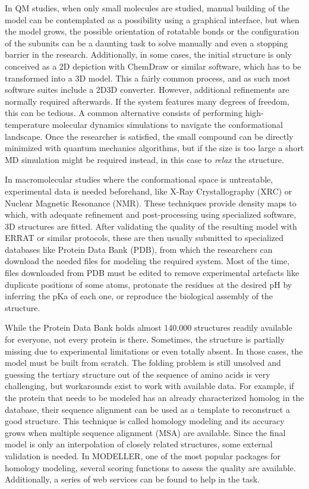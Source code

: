 In QM studies, when only small molecules are studied, manual building of the model can be contemplated as a possibility using a graphical interface,\cite{gaussview,avogadro} but when the model grows, the possible orientation of rotatable bonds or the configuration of the subunits can be a daunting task to solve manually and even a stopping barrier in the research. Additionally, in some cases, the initial structure is only conceived as a 2D depiction with ChemDraw or similar software, which has to be transformed into a 3D model. This a fairly common process, and as such most software suites include a 2D\textrightarrow 3D converter. However, additional refinements are normally required afterwards. If the system features many degrees of freedom, this can be tedious. A common alternative consists of performing high-temperature molecular dynamics simulations to navigate the conformational landscape. Once the researcher is satisfied, the small compound can be directly minimized with quantum mechanics algorithms, but if the size is too large a short MD simulation might be required instead, in this case to \textit{relax} the structure.

In macromolecular studies where the conformational space is untreatable, experimental data is needed beforehand, like X-Ray Crystallography (XRC) or Nuclear Magnetic Resonance (NMR). These techniques provide density maps to which, with adequate refinement and post-processing using specialized software,\cite{ccp4,phenix} 3D structures are fitted. After validating the quality of the resulting model with ERRAT\cite{errat} or similar protocols, these are then usually submitted to specialized databases like Protein Data Bank (PDB),\cite{proteindatabank} from which the researchers can download the needed files for modeling the required system. Most of the time, files downloaded from PDB must be edited to remove experimental artefacts like duplicate positions of some atoms, protonate the residues at the desired pH by inferring the pKa of each one,\cite{word1999asparagine,propka,addh} or reproduce the biological assembly of the structure.\cite{bietz2016siena,sym}

While the Protein Data Bank holds almost 140,000 structures readily available for everyone, not every protein is there. Sometimes, the structure is partially missing due to experimental limitations or even totally absent. In those cases, the model must be built from scratch. The folding problem is still unsolved and guessing the tertiary structure out of the sequence of amino acids is very challenging, but workarounds exist to work with available data. For example, if the protein that needs to be modeled has an already characterized homolog in the database, their sequence alignment can be used as a template to reconstruct a good structure. This technique is called homology modeling and its accuracy grows when multiple sequence alignment (MSA) are available. Since the final model is only an interpolation of closely related structures, some external validation is needed. In MODELLER, one of the most popular packages for homology modeling, several scoring functions to assess the quality are available. Additionally, a series of web services can be found to help in the task.\cite{errat,benkert2008qmean,wang2011apollo}

